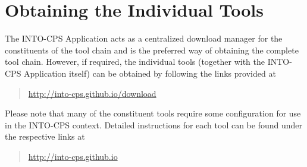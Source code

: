 \section{Obtaining the Individual Tools}
\label{appendix:getting}
The INTO-CPS Application acts as a centralized download manager for the constituents of the tool chain and is the preferred way of obtaining the complete tool chain.
%
However, if required, the individual tools (together with the INTO-CPS Application itself) can be obtained by following the links provided at
%
%
%
\begin{quote}
\parbox{\textwidth-1cm}{\url{http://into-cps.github.io/download}}
\end{quote}
%
%
%
Please note that many of the constituent tools require some configuration for use in the INTO-CPS context.
%
Detailed instructions for each tool can be found under the respective links at
%
%
%
\begin{quote}
\parbox{\textwidth-1cm}{\url{http://into-cps.github.io}}
\end{quote}
